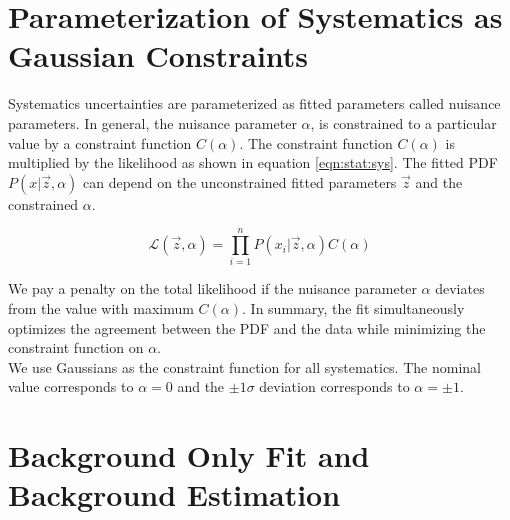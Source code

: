 \section{Parameterization of Systematics as Gaussian Constraints}
\label{sec:stat:sys}

\indent Systematics uncertainties are parameterized as fitted parameters called nuisance parameters.  In general, the nuisance parameter $\alpha$, is constrained to a particular value by a constraint function $C(\alpha)$.   The constraint function $C(\alpha)$ is multiplied by the likelihood as shown in equation \ref{eqn:stat:sys}.  The fitted PDF $P(x|\vec{z},\alpha)$ can depend on the unconstrained fitted parameters $\vec{z}$ and the constrained $\alpha$.  

\begin{equation}
\label{eqn:stat:sys}
{\mathcal{L}}(\vec{z},\alpha) = {\displaystyle\prod_{i=1}^{n}} P(x_i|\vec{z},\alpha) C(\alpha)
\end{equation}


\indent We pay a penalty on the total likelihood if the nuisance parameter $\alpha$ deviates from the value with maximum $C(\alpha)$.  In summary, the fit simultaneously optimizes the agreement between the PDF and the data while minimizing the constraint function on $\alpha$. \\

\indent We use Gaussians as the constraint function for all systematics.  The nominal value corresponds to $\alpha = 0$ and the $\pm1\sigma$ deviation corresponds to $\alpha = \pm1$.  \\


\section{Background Only Fit and Background Estimation}
\label{sec:stat:bkgonly}

